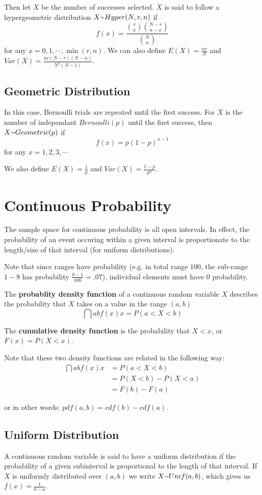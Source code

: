 \documentclass[12pt]{article}
\begin{document}
Then let $X$ be the number of successes selected. $X$ is said to follow a hypergeometric distribution $X \ttilde Hyper(N, r, n)$ if \[ f(x) = \frac{{r \choose x}{N-r \choose n-x}}{{N \choose n}} \] for any $x = 0, 1, \cdots, \min(r,n)$. We can also define $E(X) = \frac{nr}{N}$ and $Var(X) = \frac{nr(N - r)(N - n)}{N^2(N - 1)}$.

\subsection*{Geometric Distribution}
In this case, Bernoulli trials are repeated until the first success. For $X$ is the number of independant $Bernoulli(p)$ until the first success, then $X \ttilde Geometric(p)$ if \[ f(x) = p(1-p)^{x-1} \] for any $x = 1, 2, 3, \cdots$

We also define $E(X) = \frac{1}{p}$ and $Var(X) = \frac{1-p}{p^2}$.

\section*{Continuous Probability}
The sample space for continuous probability is all open intervals. In effect, the probability of an event occuring within a given interval is proportionate to the length/size of that interval (for uniform distributions).

Note that since ranges have probability (e.g. in total range $100$, the sub-range $1-8$ has probability $\frac{8-1}{100} = .07$), individual elements must have $0$ probability.

The {\bf probablity density function} of a continuous random variable $X$ describes the probability that $X$ takes on a value in the range $(a,b)$ \[\dint{a}{b}{f(x)}{x} = P(a < X < b) \]

The {\bf cumulative density function} is the probability that $X < x$, or $F(x) = P(X < x)$.

Note that these two density functions are related in the following way:
\begin{align*}
\dint{a}{b}{f(x)}{x} &= P(a < X < b)\\
                     &= P(X < b) - P(X < a)\\
                     &= F(b) - F(a)
\end{align*}

or in other words: $pdf(a,b) = cdf(b) - cdf(a)$.

\subsection*{Uniform Distribution}
A continuous random variable is said to have a uniform distribution if the probability of a given subinterval is proportional to the length of that interval. If $X$ is uniformly distributed over $(a,b)$ we write $X \ttilde Unif(a,b)$, which gives us $f(x) = \frac{1}{b-a}$.
\end{document}
